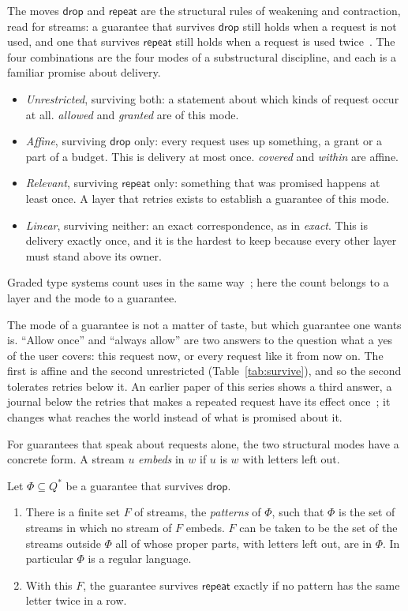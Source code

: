 \documentclass[acmsmall,nonacm,screen]{acmart}
\newcommand{\kw}[1]{\mathsf{#1}}
\newcommand{\drop}{\kw{drop}}
\newcommand{\rep}{\kw{repeat}}
\begin{document}
The moves $\drop$ and $\rep$ are the structural rules of weakening and contraction, read for
streams: a guarantee that survives $\drop$ still holds when a request is not used, and one
that survives $\rep$ still holds when a request is used twice~\cite{girard1987}. The four
combinations are the four modes of a substructural discipline, and each is a familiar promise
about delivery.
\begin{itemize}
\item \emph{Unrestricted}, surviving both: a statement about which kinds of request occur at
  all. \emph{allowed} and \emph{granted} are of this mode.
\item \emph{Affine}, surviving $\drop$ only: every request uses up something, a grant or a
  part of a budget. This is delivery at most once. \emph{covered} and \emph{within} are
  affine.
\item \emph{Relevant}, surviving $\rep$ only: something that was promised happens at least
  once. A layer that retries exists to establish a guarantee of this mode.
\item \emph{Linear}, surviving neither: an exact correspondence, as in \emph{exact}. This is
  delivery exactly once, and it is the hardest to keep because every other layer must stand
  above its owner.
\end{itemize}
Graded type systems count uses in the same way~\cite{orchard2019}; here the count belongs to
a layer and the mode to a guarantee.

The mode of a guarantee is not a matter of taste, but which guarantee one wants is. ``Allow
once'' and ``always allow'' are two answers to the question what a yes of the user covers:
this request now, or every request like it from now on. The first is affine and the second
unrestricted (Table~\ref{tab:survive}), and so the second tolerates retries below it. An
earlier paper of this series shows a third answer, a journal below the retries that makes a
repeated request have its effect once~\cite{tpp8}; it changes what reaches the world
instead of what is promised about it.

For guarantees that speak about requests alone, the two structural modes have a concrete
form. A stream $u$ \emph{embeds} in $w$ if $u$ is $w$ with letters left out.

\begin{proposition}[Patterns]
\label{prop:patterns}
Let $\Phi \subseteq Q^{*}$ be a guarantee that survives $\drop$.
\begin{enumerate}
\item There is a finite set $F$ of streams, the \emph{patterns} of $\Phi$, such that $\Phi$
  is the set of streams in which no stream of $F$ embeds. $F$ can be taken to be the set of
  the streams outside $\Phi$ all of whose proper parts, with letters left out, are in $\Phi$.
  In particular $\Phi$ is a regular language.
\item With this $F$, the guarantee survives $\rep$ exactly if no pattern has the same letter
  twice in a row.
\end{enumerate}
\end{proposition}
\end{document}
